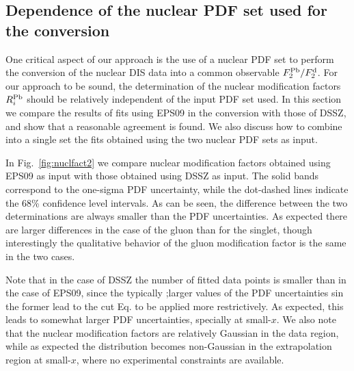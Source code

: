 \subsection{Dependence of the nuclear PDF set used for the conversion}

One critical aspect of our approach is the use of a nuclear
PDF set to perform the conversion of the nuclear DIS data
into a common observable $F_2^{\rm Pb}/F_2^{\rm d}$.
%
For our approach to be sound, the determination of the nuclear modification
factors $R_i^{\rm Pb}$ should be relatively independent
of the input PDF set used.
%
In this section we compare the results of fits using EPS09 in
the conversion with those of DSSZ, and show that a reasonable agreement
is found.
%
We also discuss how to combine into a single set the fits
obtained using the two nuclear PDF sets
as input.


In Fig.~\ref{fig:nuclfact2} we compare nuclear modification factors obtained using EPS09 as input
  with those obtained using DSSZ as input.
  The solid bands correspond to the one-sigma
  PDF uncertainty, while the dot-dashed lines
  indicate the 68\% confidence level intervals.
  As can be seen, the difference between the two determinations
  are always smaller than the PDF uncertainties.
  As expected there are larger differences in the case of the
  gluon than for the singlet, though interestingly the qualitative
  behavior of the gluon modification factor is the same in the two
  cases.

  Note that in the case of DSSZ the number of fitted data points
  is smaller than in the case of EPS09, since the typically
  ;larger values of the PDF uncertainties sin the former
  lead to the cut Eq. to be applied more restrictively.
  As expected, this leads to somewhat larger PDF uncertainties,
  specially at small-$x$.
  We also note that the nuclear modification factors are relatively
  Gaussian in the data region, while as expected the distribution
  becomes non-Gaussian in the extrapolation region at small-$x$,
  where no experimental constraints are available.

  

